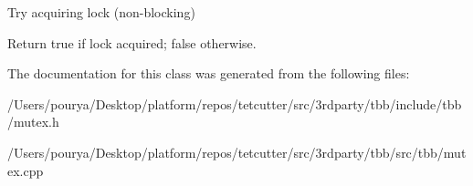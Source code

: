 Try acquiring lock (non-\/blocking) 

Return true if lock acquired; false otherwise. 

The documentation for this class was generated from the following files\+:\begin{DoxyCompactItemize}
\item 
/\+Users/pourya/\+Desktop/platform/repos/tetcutter/src/3rdparty/tbb/include/tbb/mutex.\+h\item 
/\+Users/pourya/\+Desktop/platform/repos/tetcutter/src/3rdparty/tbb/src/tbb/mutex.\+cpp\end{DoxyCompactItemize}
